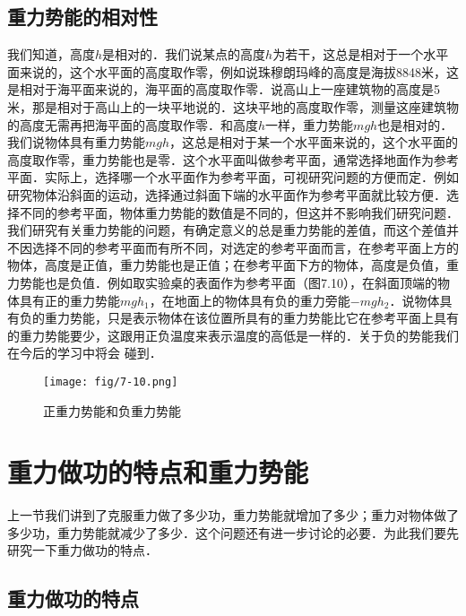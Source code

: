 \subsection{重力势能的相对性}

我们知道，高度$h$是相对的．我们说某点的高度$h$为若干，这总是相对于一个水平面来说的，这个水平面的高度取作零，例如说珠穆朗玛峰的高度是海拔8848米，这是相对于海平面来说的，海平面的高度取作零．说高山上一座建筑物的高度是5米，那是相对于高山上的一块平地说的．这块平地的高度取作零，测量这座建筑物的高度无需再把海平面的高度取作零．和高度$h$一样，重力势能$mgh$也是相对的．我们说物体具有重力势能$mgh$，这总是相对于某一个水平面来说的，这个水平面的高度取作零，重力势能也是零．这个水平面叫做参考平面，通常选择地面作为参考平面．实际上，选择哪一个水平面作为参考平面，可视研究问题的方便而定．例如研究物体沿斜面的运动，选择通过斜面下端的水平面作为参考平面就比较方便．选择不同的参考平面，物体重力势能的数值是不同的，但这并不影响我们研究问题．我们研究有关重力势能的问题，有确定意义的总是重力势能的差值，而这个差值并不因选择不同的参考平面而有所不同，对选定的参考平面而言，在参考平面上方的物体，高度是正值，重力势能也是正值；在参考平面下方的物体，高度是负值，重力势能也是负值．例如取实验桌的表面作为参考平面（图7.10），在斜面顶端的物体具有正的重力势能$mgh_1$，在地面上的物体具有负的重力旁能$-mgh_2$．说物体具有负的重力势能，只是表示物体在该位置所具有的重力势能比它在参考平面上具有的重力势能要少，这跟用正负温度来表示温度的高低是一样的．关于负的势能我们在今后的学习中将会
碰到．
\begin{figure}[htp]
\centering\texttt{[image: fig/7-10.png]}
\caption{正重力势能和负重力势能}
\end{figure}

\section{重力做功的特点和重力势能}
上一节我们讲到了克服重力做了多少功，重力势能就增加了多少；重力对物体做了多少功，重力势能就减少了多少．这个问题还有进一步讨论的必要．为此我们要先研究一下重力做功的特点．

\subsection{重力做功的特点}
\begin{figure}[htp]\centering
{}
\caption{}
\end{figure}

